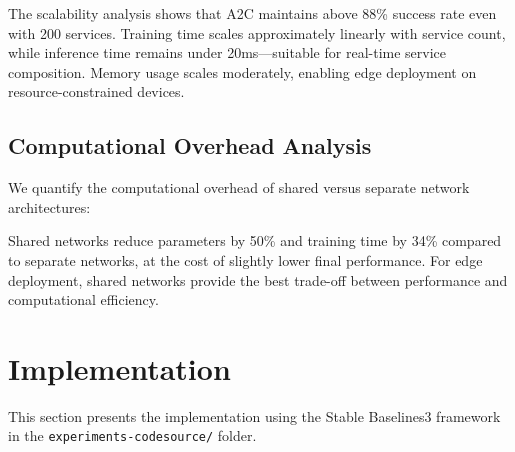 \documentclass[10pt,twocolumn]{article}
\begin{document}
The scalability analysis shows that A2C maintains above 88\% success
rate even with 200 services. Training time scales approximately linearly
with service count, while inference time remains under 20ms---suitable
for real-time service composition. Memory usage scales moderately,
enabling edge deployment on resource-constrained devices.

\subsection{Computational Overhead Analysis}\label{computational-overhead-analysis}

We quantify the computational overhead of shared versus separate
network architectures:

\begin{table}[t]
	\centering
	\caption{Computational Overhead: Shared vs Separate Networks}
	\label{overhead-table}
\end{table}

Shared networks reduce parameters by 50\% and training time by 34\%
compared to separate networks, at the cost of slightly lower final
performance. For edge deployment, shared networks provide the best
trade-off between performance and computational efficiency.

\section{Implementation}\label{implementation}

This section presents the implementation using the Stable Baselines3
framework in the \texttt{experiments-codesource/} folder.
\end{document}
